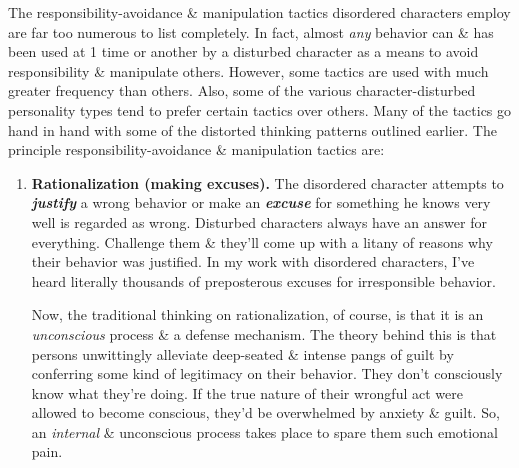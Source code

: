 \documentclass{article}
\numberwithin{equation}{section}
\begin{document}
The responsibility-avoidance \& manipulation tactics disordered characters employ are far too numerous to list completely. In fact, almost \textit{any} behavior can \& has been used at 1 time or another by a disturbed character as a means to avoid responsibility \& manipulate others. However, some tactics are used with much greater frequency than others. Also, some of the various character-disturbed personality types tend to prefer certain tactics over others. Many of the tactics go hand in hand with some of the distorted thinking patterns outlined earlier. The principle responsibility-avoidance \& manipulation tactics are:
\begin{enumerate}
	\item \textbf{Rationalization (making excuses).} The disordered character attempts to \textbf{\textit{justify}} a wrong behavior or make an \textbf{\textit{excuse}} for something he knows very well is regarded as wrong. Disturbed characters always have an answer for everything. Challenge them \& they'll come up with a litany of reasons why their behavior was justified. In my work with disordered characters, I've heard literally thousands of preposterous excuses for irresponsible behavior.
	
	Now, the traditional thinking on rationalization, of course, is that it is an \textit{unconscious} process \& a defense mechanism. The theory behind this is that persons unwittingly alleviate deep-seated \& intense pangs of guilt by conferring some kind of legitimacy on their behavior. They don't consciously know what they're doing. If the true nature of their wrongful act were allowed to become conscious, they'd be overwhelmed by anxiety \& guilt. So, an \textit{internal} \& unconscious process takes place to spare them such emotional pain.
	

\end{enumerate}
\end{document}
